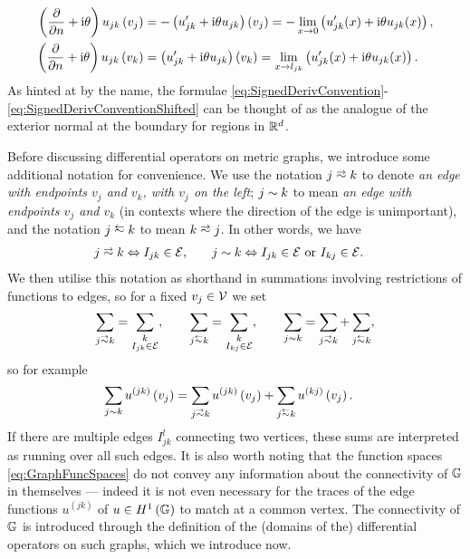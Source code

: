 \begin{subequations} \label{eq:SignedDerivConventionShifted}
	\begin{align*}
		\left( \dfrac{\partial }{\partial n}+ \mathrm{i}\theta \right)u_{jk}\left( v_j \right) &= -\left( u_{jk}' + \mathrm{i}\theta u_{jk} \right)\left( v_j \right) = -\lim_{x\rightarrow0} \left(  u_{jk}'(x)+\mathrm{i}\theta u_{jk}(x)  \right), \\
		\left( \dfrac{\partial }{\partial n}+ \mathrm{i}\theta \right)u_{jk}\left( v_k \right) &= \left( u_{jk}' + \mathrm{i}\theta u_{jk} \right)\left( v_k \right) = \lim_{x\rightarrow l_{jk}} \left(  u_{jk}'(x)+\mathrm{i}\theta u_{jk}(x)  \right).
	\end{align*}
\end{subequations}
As hinted at by the name, the formulae \eqref{eq:SignedDerivConvention}-\eqref{eq:SignedDerivConventionShifted} can be thought of as the analogue of the exterior normal at the boundary for regions in $\mathbb{R}^d$.

Before discussing differential operators on metric graphs, we introduce some additional notation for convenience.
We use the notation $j\conLeft k$ to denote \emph{an edge with endpoints $v_j$ and $v_k$, with $v_j$ on the left}; $j\sim k$ to mean \emph{an edge with endpoints $v_j$ and $v_k$} (in contexts where the direction of the edge is unimportant), and the notation $j \conRight k$ to mean $k\conLeft j$.
In other words, we have
\begin{align*}
	j\conLeft k \Leftrightarrow I_{jk}\in \edgeSet, &\qquad
	j\con k \Leftrightarrow I_{jk}\in \edgeSet \text{ or } I_{kj}\in \edgeSet.
\end{align*}
We then utilise this notation as shorthand in summations involving restrictions of functions to edges, so for a fixed $v_j\in\mathcal{V}$ we set
\begin{align*}
	\sum_{j\conLeft k} = \sum_{\substack{k \\ I_{jk}\in \edgeSet}}, 
	\qquad 	\sum_{j\conRight k} = \sum_{\substack{k \\ I_{kj}\in \edgeSet}},
	\qquad \sum_{j\con k} = \sum_{j\conLeft k} + \sum_{j\conRight k},
\end{align*}
so for example
\begin{align*}
	\sum_{j\con k}u^{(jk)}\bracs{v_j} &= \sum_{j\conLeft k}u^{(jk)}\bracs{v_j} + \sum_{j\conRight k}u^{(kj)}\bracs{v_j}.
\end{align*}
If there are multiple edges $I_{jk}^l$ connecting two vertices, these sums are interpreted as running over all such edges.
It is also worth noting that the function spaces \eqref{eq:GraphFuncSpaces} do not convey any information about the connectivity of $\mathbb{G}$ in themselves --- indeed it is not even necessary for the traces of the edge functions $u^{(jk)}$ of $u\in H^1\left( \mathbb{G} \right)$ to match at a common vertex. 
The connectivity of $\mathbb{G}$ is introduced through the definition of the (domains of the) differential operators on such graphs, which we introduce now.

